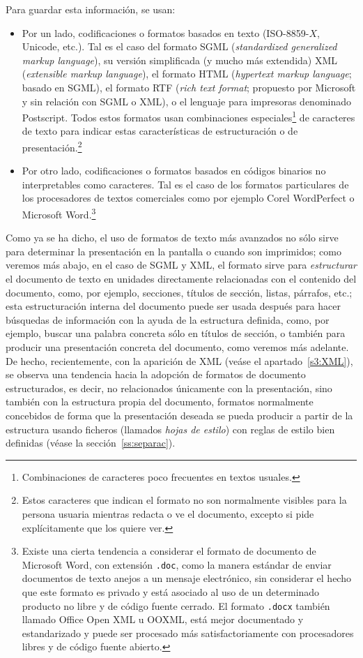 Para guardar esta información, se usan: \begin{itemize} \item Por un lado, codificaciones o formatos basados en texto (ISO-8859-$X$, Unicode, etc.). Tal es el caso del formato SGML (\emph{standardized generalized markup language}), su versión simplificada (y mucho más extendida) XML (\emph{extensible markup language}), el formato HTML (\emph{hypertext markup language}; basado en SGML), el formato RTF (\emph{rich text format}; propuesto por Microsoft y sin relación con SGML o XML), o el lenguaje para impresoras denominado Postscript. Todos estos formatos usan combinaciones especiales\footnote{Combinaciones de caracteres poco frecuentes en textos usuales.} de caracteres de texto para indicar estas características de estructuración o de presentación.\footnote{Estos caracteres que indican el formato no son normalmente visibles para la persona usuaria mientras redacta o ve el documento, excepto si pide explícitamente que los quiere ver.} \item Por otro lado, codificaciones o formatos basados en códigos binarios no interpretables como caracteres. Tal es el caso de los formatos particulares de los procesadores de textos comerciales como por ejemplo Corel WordPerfect o Microsoft Word.\footnote{Existe una cierta tendencia a considerar el formato de documento de Microsoft Word, con extensión \texttt{.doc}, como la manera estándar de enviar documentos de texto anejos a un mensaje electrónico, sin considerar el hecho que este formato es privado y está asociado al uso de un determinado producto no libre y de código fuente cerrado. El formato \texttt{.docx} también llamado Office Open XML u OOXML, está mejor documentado y estandarizado y puede ser procesado más satisfactoriamente con procesadores libres y de código fuente abierto.} \end{itemize} Como ya se ha dicho, el uso de formatos de texto más avanzados no sólo sirve para determinar la presentación en la pantalla o cuando son imprimidos; como veremos más abajo, en el caso de SGML y XML, el formato sirve para \emph{estructurar} el documento de texto en unidades directamente relacionadas con el contenido del documento, como, por ejemplo, secciones, títulos de sección, listas, párrafos, etc.; esta estructuración interna del documento puede ser usada después para hacer búsquedas de información con la ayuda de la estructura definida, como, por ejemplo, buscar una palabra concreta sólo en títulos de sección, o también para producir una presentación concreta del documento, como veremos más adelante. De hecho, recientemente, con la aparición de XML (veáse el apartado~\ref{s3:XML}), se observa una tendencia hacia la adopción de formatos de documento estructurados, es decir, no relacionados únicamente con la presentación, sino también con la estructura propia del documento, formatos normalmente concebidos de forma que la presentación deseada se pueda producir a partir de la estructura usando ficheros (llamados \emph{hojas de estilo}) con reglas de estilo bien definidas (véase la sección~\ref{ss:separac}). 

